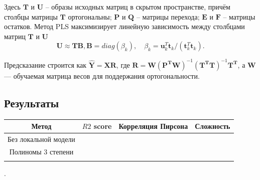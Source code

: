 \documentclass[12pt, twoside]{article}
\begin{document}
Здесь $\mathbf{T}$ и $\mathbf{U}$ – образы исходных матриц в скрытом пространстве, причём столбцы матрицы
$\mathbf{T}$ ортогональны; $\mathbf{P}$ и $\mathbf{Q}$ – матрицы перехода; $\mathbf{E}$ и $\mathbf{F}$ – матрицы остатков. Метод PLS
максимизирует линейную зависимость между столбцами матриц $\mathbf{T}$ и $\mathbf{U}$
\[\mathbf{U} \approx \mathbf{TB}, \mathbf{B} = diag(\beta_k), \quad \beta_k = \mathbf{u}^T_k 
\mathbf{t}_k/(\mathbf{t}^T_k\mathbf{
t}_k).
\]

Предсказание строится как $\hat{\mathbf{Y}} = \mathbf{XR}$, где $\mathbf{R} = \mathbf{W(P^TW)}^{-1}\mathbf{(T^TT)}^{-1}\mathbf{T^T}$, а $\mathbf{W}$ --- обучаемая матрица весов для поддержания ортогональности.
\subsection{Результаты}

\begin{table}[h!]
	\centering
	\begin{tabular}{|c|c|c|c|}
		\hline
		Метод & $R2$ score & Корреляция Пирсона & Сложность \\ \hline
	Без локальной модели	&                          &                    &           \\ \hline
	Полиномы 3 степени	&                          &                    &           \\ \hline
		&                          &                    &           \\ \hline
	\end{tabular}
\end{table}
\newpage
.
\newpage


\end{document}
